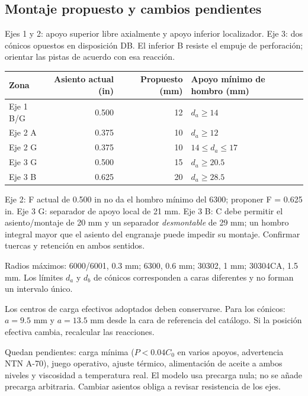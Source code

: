 \documentclass[11pt,a4paper]{article}
\begin{document}
\subsection{Montaje propuesto y cambios pendientes}
Ejes 1 y 2: apoyo superior libre axialmente y apoyo inferior localizador. Eje 3: dos cónicos opuestos en disposición DB. El inferior B resiste el empuje de perforación; orientar las pistas de acuerdo con esa reacción.

\begin{center}\small\begin{tabular}{lrrl}\toprule

Zona & Asiento actual (in) & Propuesto (mm) & Apoyo mínimo de hombro (mm) \\ \midrule

Eje 1 B/G & 0.500 & 12 & $d_a\geq14$ \\

Eje 2 A & 0.375 & 10 & $d_a\geq12$ \\

Eje 2 G & 0.375 & 10 & $14\leq d_a\leq17$ \\

Eje 3 G & 0.500 & 15 & $d_a\geq20.5$ \\

Eje 3 B & 0.625 & 20 & $d_a\geq28.5$ \\

\bottomrule\end{tabular}\end{center}

Eje 2: F actual de 0.500 in no da el hombro mínimo del 6300; proponer F = 0.625 in. Eje 3 G: separador de apoyo local de 21 mm. Eje 3 B: C debe permitir el asiento/montaje de 20 mm y un separador \emph{desmontable} de 29 mm; un hombro integral mayor que el asiento del engranaje puede impedir su montaje. Confirmar tuercas y retención en ambos sentidos.

Radios máximos: 6000/6001, 0.3 mm; 6300, 0.6 mm; 30302, 1 mm; 30304CA, 1.5 mm. Los límites $d_a$ y $d_b$ de cónicos corresponden a caras diferentes y no forman un intervalo único.

Los centros de carga efectivos adoptados deben conservarse. Para los cónicos: $a=9.5$ mm y $a=13.5$ mm desde la cara de referencia del catálogo. Si la posición efectiva cambia, recalcular las reacciones.

Quedan pendientes: carga mínima ($P<0.04C_0$ en varios apoyos, advertencia NTN A-70), juego operativo, ajuste térmico, alimentación de aceite a ambos niveles y viscosidad a temperatura real. El modelo usa precarga nula; no se añade precarga arbitraria. Cambiar asientos obliga a revisar resistencia de los ejes.
\end{document}
